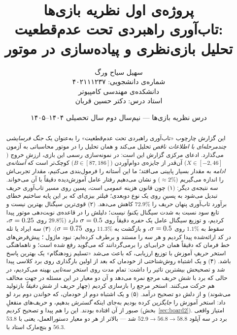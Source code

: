 \documentclass[12pt,a4paper]{article}
\title{\vspace{-1.6cm}پروژه‌ی اول نظریه بازی‌ها\\[4pt]
\large تاب‌آوری راهبردی تحت عدم‌قطعیت:\\
تحلیل بازی‌نظری و پیاده‌سازی در موتور \lr{SEE}}
\author{سهیل سیاح ورگ\\[2pt]
\normalsize شماره‌ی دانشجویی: ۴۰۲۱۱۱۲۳۷\\[4pt]
\normalsize دانشکده‌ی مهندسی کامپیوتر\\[2pt]
\normalsize استاد درس: دکتر حسین قربان}
\date{درس نظریه بازی‌ها --- نیم‌سال دوم سال تحصیلی ۱۴۰۴--۱۴۰۵}
\begin{document}
\maketitle
\vspace{-0.9cm}

\begin{abstract}\noindent
این گزارش چارچوب «تاب‌آوری راهبردی تحت عدم‌قطعیت» را به‌عنوان یک
\emph{جنگ فرسایشی چندمرحله‌ای با اطلاعات ناقص} تحلیل می‌کند و همان تحلیل را
در موتور محاسباتی  به آزمون می‌گذارد. ادعای مرکزی گزارش این است:
در نمونه‌سازی رسمی این بازی، ارزش خروج ($X\in[-2,46]$) آن‌قدر از جایزه‌ی
دوام‌آوردن ($B\in[87,186]$) کوچک‌تر است که \emph{آستانه‌ی ادامه} به مقدار
بسیار پایینی می‌افتد؛ ما این آستانه را فرمول‌بندی می‌کنیم، مقدار تجربی‌اش را
اندازه می‌گیریم ($\approx 2\%$) و نشان می‌دهیم رفتار عامل آموزش‌دیده دقیقاً با
آن می‌خواند. سه نتیجه‌ی دیگر: (۱) چون قانون هزینه \emph{عمومی} است، پسین روی
مسیر تاب‌آوری حریف تبدیل می‌شود به پسینِ روی یک نوع دوبعدی؛ فیلتر بیزی‌ای که بر
این پایه ساختیم خطای برآورد تاب‌آوری پنهان حریف را $72.9\%$ کاهش می‌دهد.
(۲) قوی‌ترین سیگنال بهترین نیست و تابع سود نسبت به شدت سیگنال \emph{یکنوا
نیست}؛ دلیلش را در قاعده‌ی نوبت‌دهی موتور پیدا کردیم، و توزیع سیگنال عامل
یک \emph{حفره} دقیقاً روی $\sigma=0.5$ دارد (‏$29.8\%$ روی $\sigma=0.25$، سقوط
به $1.1\%$ روی $\sigma=0.5$، و بازگشت به $11.3\%$ روی $\sigma=0.75$).
(۳) سه ایراد یا تله در کد ارائه‌شده پیدا کردیم و هر سه را مستند و برطرف
کرده‌ایم: نبود ماژول ؛ پیش‌فرض‌های خط فرمان
 که دقیقاً همان خرابی‌ای را برمی‌گردانند که 
می‌گوید رفع شده است؛ و ناهماهنگی استخر حریفِ آموزش با توزیع ارزیابی، که
باعث می‌شد «تسلیم زودهنگام» یک بهترین پاسخ باشد.
(۴) و یک اشتباه روش‌شناختی از خودمان که بعد از اولین بارگذاری روی برد
کلاسی پیدا شد و تصحیحش بیشترین تاثیر را داشت: تمام مدت روی استخر
\emph{سه‌تایی}  بهینه می‌کردیم، در حالی که برد
با شش حریف مرجع نمره می‌دهد و آن دو معیار در این مسئله در جهت
مخالف هم حرکت می‌کنند. استخر مرجع را بازسازی کردیم (چهار حریف از شش
\emph{دقیقاً} بازتولید می‌شوند) و از دلش دو تصحیح درآمد.
(۵) و یک اشتباه دوم از خودمان، که خواندن دوم برد لو داد: استخر آموزش را
\emph{جایگزین} کرده بودیم به‌جای اینکه \emph{گسترش} بدهیم، و حریف‌های
منفعلِ صبور از آن افتاده بودند. این را هم پیدا و تصحیح کردیم
(بخش~\ref{sec:board2}). امتیاز واقعی برد در سه آپلود
$52.9 \to 56.8 \to \mathbf{58.8}$ شد — بالاتر از هر دو معیار
دستورالعمل، یعنی  با $53.8$ و بنچ‌مارک استاد با $56.3$.
\end{abstract}

\tableofcontents
\end{document}
